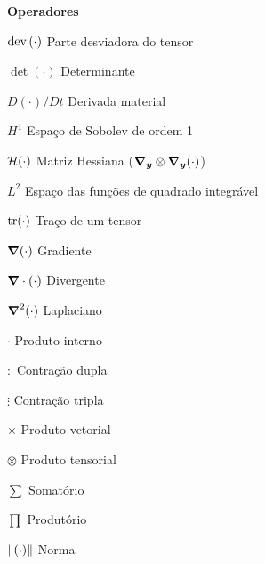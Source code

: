 \begin{simbolos}
    \item[\textbf{Operadores}]
    \item[$\mathop{\mathrm{dev}}\nolimits{(}\cdot)$] Parte desviadora do tensor
    \item[$\det{(\cdot)}$] Determinante
    \item[$D(\cdot)/Dt$] Derivada material
    \item[$H^1$] Espaço de Sobolev de ordem 1
    \item[$\mathcal{H}(\cdot)$] Matriz Hessiana ($\boldsymbol{\nabla_y}\otimes\boldsymbol{\nabla_y}(\cdot)$)
    \item[$L^2$] Espaço das funções de quadrado integrável
    \item[$\mathop{\mathrm{tr}}\nolimits(\cdot)$] Traço de um tensor
    \item[$\boldsymbol{\nabla}(\cdot)$] Gradiente
    \item[$\boldsymbol{\nabla}\cdot(\cdot)$] Divergente
    \item[$\boldsymbol{\nabla}^2(\cdot)$] Laplaciano
    \item[$\cdot$] Produto interno
    \item[$:$] Contração dupla
    \item[$\vdots$] Contração tripla
    \item[$\times$] Produto vetorial
    \item[$\otimes$] Produto tensorial
    \item[$\sum$] Somatório
    \item[$\prod$] Produtório
    \item[$\left\lVert{(\cdot)}\right\lVert$] Norma


\end{simbolos}
